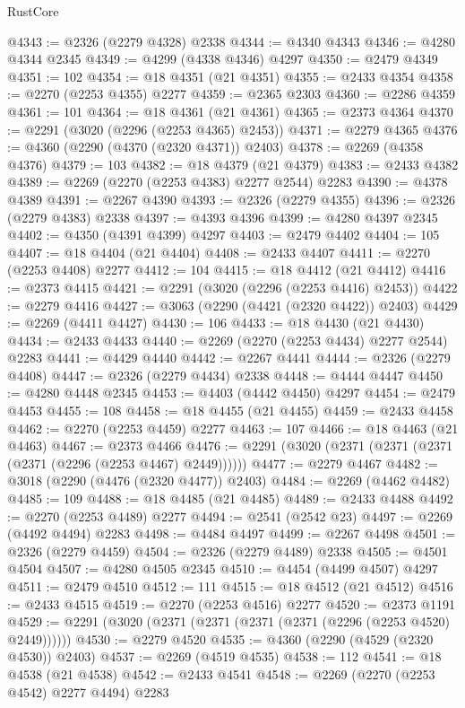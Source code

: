 \begin{lexlean}{RustCore}
\begin{coremodule}
@4343 := @2326 (@2279 @4328) @2338
@4344 := @4340 @4343
@4346 := @4280 @4344 @2345
@4349 := @4299 (@4338 @4346) @4297
@4350 := @2479 @4349
@4351 := 102
@4354 := @18 @4351 (@21 @4351)
@4355 := @2433 @4354
@4358 := @2270 (@2253 @4355) @2277
@4359 := @2365 @2303
@4360 := @2286 @4359
@4361 := 101
@4364 := @18 @4361 (@21 @4361)
@4365 := @2373 @4364
@4370 := @2291 (@3020 (@2296 (@2253 @4365) @2453))
@4371 := @2279 @4365
@4376 := @4360 (@2290 (@4370 (@2320 @4371)) @2403)
@4378 := @2269 (@4358 @4376)
@4379 := 103
@4382 := @18 @4379 (@21 @4379)
@4383 := @2433 @4382
@4389 := @2269 (@2270 (@2253 @4383) @2277 @2544) @2283
@4390 := @4378 @4389
@4391 := @2267 @4390
@4393 := @2326 (@2279 @4355)
@4396 := @2326 (@2279 @4383) @2338
@4397 := @4393 @4396
@4399 := @4280 @4397 @2345
@4402 := @4350 (@4391 @4399) @4297
@4403 := @2479 @4402
@4404 := 105
@4407 := @18 @4404 (@21 @4404)
@4408 := @2433 @4407
@4411 := @2270 (@2253 @4408) @2277
@4412 := 104
@4415 := @18 @4412 (@21 @4412)
@4416 := @2373 @4415
@4421 := @2291 (@3020 (@2296 (@2253 @4416) @2453))
@4422 := @2279 @4416
@4427 := @3063 (@2290 (@4421 (@2320 @4422)) @2403)
@4429 := @2269 (@4411 @4427)
@4430 := 106
@4433 := @18 @4430 (@21 @4430)
@4434 := @2433 @4433
@4440 := @2269 (@2270 (@2253 @4434) @2277 @2544) @2283
@4441 := @4429 @4440
@4442 := @2267 @4441
@4444 := @2326 (@2279 @4408)
@4447 := @2326 (@2279 @4434) @2338
@4448 := @4444 @4447
@4450 := @4280 @4448 @2345
@4453 := @4403 (@4442 @4450) @4297
@4454 := @2479 @4453
@4455 := 108
@4458 := @18 @4455 (@21 @4455)
@4459 := @2433 @4458
@4462 := @2270 (@2253 @4459) @2277
@4463 := 107
@4466 := @18 @4463 (@21 @4463)
@4467 := @2373 @4466
@4476 := @2291 (@3020 (@2371 (@2371 (@2371 (@2371 (@2296 (@2253 @4467) @2449))))))
@4477 := @2279 @4467
@4482 := @3018 (@2290 (@4476 (@2320 @4477)) @2403)
@4484 := @2269 (@4462 @4482)
@4485 := 109
@4488 := @18 @4485 (@21 @4485)
@4489 := @2433 @4488
@4492 := @2270 (@2253 @4489) @2277
@4494 := @2541 (@2542 @23)
@4497 := @2269 (@4492 @4494) @2283
@4498 := @4484 @4497
@4499 := @2267 @4498
@4501 := @2326 (@2279 @4459)
@4504 := @2326 (@2279 @4489) @2338
@4505 := @4501 @4504
@4507 := @4280 @4505 @2345
@4510 := @4454 (@4499 @4507) @4297
@4511 := @2479 @4510
@4512 := 111
@4515 := @18 @4512 (@21 @4512)
@4516 := @2433 @4515
@4519 := @2270 (@2253 @4516) @2277
@4520 := @2373 @1191
@4529 := @2291 (@3020 (@2371 (@2371 (@2371 (@2371 (@2296 (@2253 @4520) @2449))))))
@4530 := @2279 @4520
@4535 := @4360 (@2290 (@4529 (@2320 @4530)) @2403)
@4537 := @2269 (@4519 @4535)
@4538 := 112
@4541 := @18 @4538 (@21 @4538)
@4542 := @2433 @4541
@4548 := @2269 (@2270 (@2253 @4542) @2277 @4494) @2283

\end{coremodule}
\end{lexlean}
